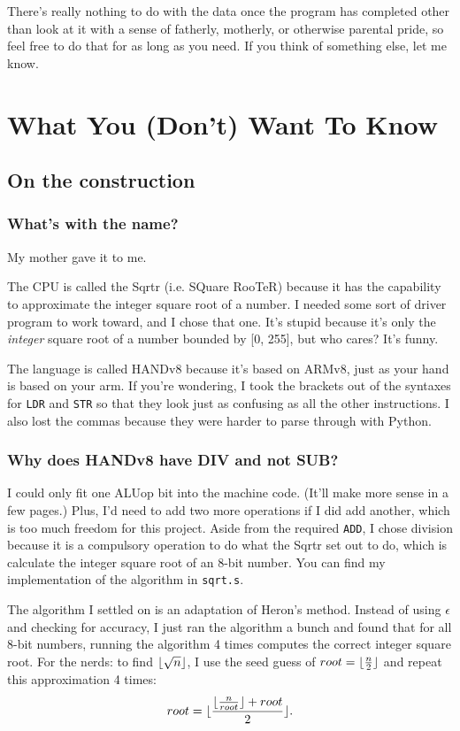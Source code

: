 \documentclass[12pt, oneside]{memoir}
\DeclarePairedDelimiter{\floor}{\lfloor}{\rfloor}
\newcommand{\instruction}[1]{{\color{instruction}\texttt{#1}}}
\begin{document}
There's really nothing to do with the data once the program has completed other than look at it with a sense of fatherly, motherly, or otherwise parental pride, so feel free to do that for as long as you need. If you think of something else, let me know.




\part{What You (Don't) Want To Know}
\raggedright
\setlength{\parindent}{1.5em}
\setlength{\parskip}{1em}
\chapter{On the construction}
\section{What's with the name?}
My mother gave it to me.

The CPU is called the Sqrtr (i.e. SQuare RooTeR) because it has the capability to approximate the integer square root of a number. I needed some sort of driver program to work toward, and I chose that one. It's stupid because it's only the \emph{integer} square root of a number bounded by [0, 255], but who cares? It's funny.

The language is called HANDv8 because it's based on ARMv8, just as your hand is based on your arm. If you're wondering, I took the brackets out of the syntaxes for \instruction{LDR} and \instruction{STR} so that they look just as confusing as all the other instructions. I also lost the commas because they were harder to parse through with Python.

\section{Why does HANDv8 have DIV and not SUB?}
I could only fit one ALUop bit into the machine code. (It'll make more sense in a few pages.) Plus, I'd need to add two more operations if I did add another, which is too much freedom for this project. Aside from the required \instruction{ADD}, I chose division because it is a compulsory operation to do what the Sqrtr set out to do, which is calculate the integer square root of an 8-bit number. You can find my implementation of the algorithm in \texttt{sqrt.s}.

The algorithm I settled on is an adaptation of Heron's method. Instead of using $\epsilon$ and checking for accuracy, I just ran the algorithm a bunch and found that for all 8-bit numbers, running the algorithm 4 times computes the correct integer square root. For the nerds: to find $\floor{\sqrt{n}}$, I use the seed guess of $root = \floor{\frac{n}{2}}$ and repeat this approximation 4 times:
\begin{equation*}
    root = \floor{\frac{\floor{\frac{n}{root}} + root}{2}}.
\end{equation*}
\end{document}
